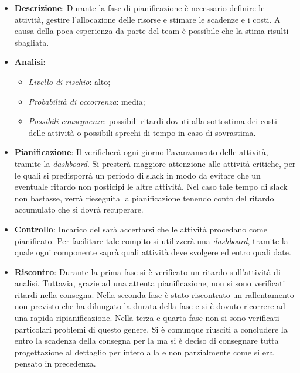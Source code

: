 			\begin{itemize}
				\item \textbf{Descrizione}: Durante la fase di pianificazione è necessario definire le attività, gestire l'allocazione delle risorse e stimare le scadenze e i costi. A causa della poca esperienza da parte del team è possibile che la stima risulti sbagliata.
				\item \textbf{Analisi}:
				\begin{itemize}
					\item \textit{Livello di rischio}: alto;
					\item \textit{Probabilità di occorrenza}: media;
					\item \textit{Possibili conseguenze}: possibili ritardi dovuti alla sottostima dei costi delle attività o possibili sprechi di tempo in caso di sovrastima. 
				\end{itemize}
				\item \textbf{Pianificazione}: Il  verificherà ogni giorno l'avanzamento delle attività, tramite la \textit{dashboard}. Si presterà maggiore attenzione alle attività critiche, per le quali si predisporrà un periodo di slack in modo da evitare che un eventuale ritardo non posticipi le altre attività. Nel caso tale tempo di slack non bastasse, verrà rieseguita la pianificazione tenendo conto del ritardo accumulato che si dovrà recuperare.
				\item \textbf{Controllo}: Incarico del  sarà accertarsi che le attività procedano come pianificato. Per facilitare tale compito si utilizzerà una \textit{dashboard}, tramite la quale ogni componente saprà quali attività deve svolgere ed entro quali date.
				\item \textbf{Riscontro}: Durante la prima fase si è verificato un ritardo sull’attività di analisi. Tuttavia, grazie ad una attenta pianificazione, non si sono verificati ritardi nella consegna. Nella seconda fase è stato riscontrato un rallentamento non previsto che ha dilungato la durata della fase e si è dovuto ricorrere ad una rapida ripianificazione. Nella terza e quarta fase non si sono verificati particolari problemi di questo genere. Si è comunque riusciti a concludere la  entro la scadenza della consegna per la  ma si è deciso di consegnare tutta progettazione al dettaglio per intero alla  e non parzialmente come si era pensato in precedenza.
			\end{itemize}
